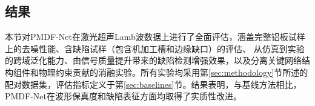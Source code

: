 \subsection{结果}
\label{sec:results}

本节对PMDF-Net在激光超声Lamb波数据上进行了全面评估，涵盖完整铝板试样上的去噪性能、含缺陷试样（包含机加工槽和边缘缺口）的评估、
从仿真到实验的跨域泛化能力、由信号质量提升带来的缺陷检测增强效果，以及分离关键网络结构组件和物理约束贡献的消融实验。所有实验均采用第\ref{sec:methodology}节所述的配对数据集，评估指标定义于第\ref{sec:baselines}节。结果表明，与基线方法相比，PMDF-Net在波形保真度和缺陷表征方面均取得了实质性改进。
